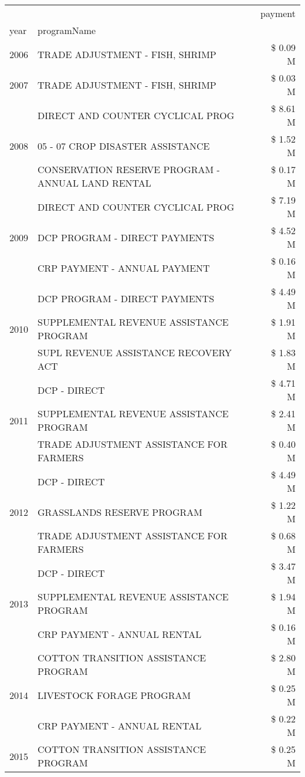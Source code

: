 \begin{tabular}{llr}
\toprule
 &  & payment \\
year & programName &  \\
\midrule
2006 & TRADE ADJUSTMENT - FISH, SHRIMP & \$ 0.09 M \\
\cline{1-3}
2007 & TRADE ADJUSTMENT - FISH, SHRIMP & \$ 0.03 M \\
\cline{1-3}
\multirow[t]{3}{*}{2008} & DIRECT AND COUNTER CYCLICAL PROG & \$ 8.61 M \\
 & 05 - 07 CROP DISASTER ASSISTANCE & \$ 1.52 M \\
 & CONSERVATION RESERVE PROGRAM - ANNUAL LAND RENTAL & \$ 0.17 M \\
\cline{1-3}
\multirow[t]{3}{*}{2009} & DIRECT AND COUNTER CYCLICAL PROG & \$ 7.19 M \\
 & DCP PROGRAM - DIRECT PAYMENTS & \$ 4.52 M \\
 & CRP PAYMENT - ANNUAL PAYMENT & \$ 0.16 M \\
\cline{1-3}
\multirow[t]{3}{*}{2010} & DCP PROGRAM - DIRECT PAYMENTS & \$ 4.49 M \\
 & SUPPLEMENTAL REVENUE ASSISTANCE PROGRAM & \$ 1.91 M \\
 & SUPL REVENUE ASSISTANCE RECOVERY ACT & \$ 1.83 M \\
\cline{1-3}
\multirow[t]{3}{*}{2011} & DCP - DIRECT & \$ 4.71 M \\
 & SUPPLEMENTAL REVENUE ASSISTANCE PROGRAM & \$ 2.41 M \\
 & TRADE ADJUSTMENT ASSISTANCE FOR FARMERS & \$ 0.40 M \\
\cline{1-3}
\multirow[t]{3}{*}{2012} & DCP - DIRECT & \$ 4.49 M \\
 & GRASSLANDS RESERVE PROGRAM & \$ 1.22 M \\
 & TRADE ADJUSTMENT ASSISTANCE FOR FARMERS & \$ 0.68 M \\
\cline{1-3}
\multirow[t]{3}{*}{2013} & DCP - DIRECT & \$ 3.47 M \\
 & SUPPLEMENTAL REVENUE ASSISTANCE PROGRAM & \$ 1.94 M \\
 & CRP PAYMENT - ANNUAL RENTAL & \$ 0.16 M \\
\cline{1-3}
\multirow[t]{3}{*}{2014} & COTTON TRANSITION ASSISTANCE PROGRAM & \$ 2.80 M \\
 & LIVESTOCK FORAGE PROGRAM & \$ 0.25 M \\
 & CRP PAYMENT - ANNUAL RENTAL & \$ 0.22 M \\
\cline{1-3}
\multirow[t]{3}{*}{2015} & COTTON TRANSITION ASSISTANCE PROGRAM & \$ 0.25 M \\

\end{tabular}
